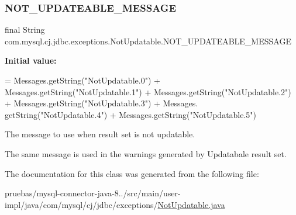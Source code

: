 \subsubsection{\texorpdfstring{N\+O\+T\+\_\+\+U\+P\+D\+A\+T\+E\+A\+B\+L\+E\+\_\+\+M\+E\+S\+S\+A\+GE}{NOT\_UPDATEABLE\_MESSAGE}}
{\footnotesize\ttfamily final String com.\+mysql.\+cj.\+jdbc.\+exceptions.\+Not\+Updatable.\+N\+O\+T\+\_\+\+U\+P\+D\+A\+T\+E\+A\+B\+L\+E\+\_\+\+M\+E\+S\+S\+A\+GE\hspace{0.3cm}{\ttfamily [static]}}

{\bfseries Initial value\+:}
\begin{DoxyCode}
= Messages.getString(\textcolor{stringliteral}{"NotUpdatable.0"}) + Messages.getString(\textcolor{stringliteral}{"NotUpdatable.1"})
            + Messages.getString(\textcolor{stringliteral}{"NotUpdatable.2"}) + Messages.getString(\textcolor{stringliteral}{"NotUpdatable.3"}) + Messages.
      getString(\textcolor{stringliteral}{"NotUpdatable.4"})
            + Messages.getString(\textcolor{stringliteral}{"NotUpdatable.5"})
\end{DoxyCode}
The message to use when result set is not updatable.

The same message is used in the warnings generated by Updatabale result set. 

The documentation for this class was generated from the following file\+:\begin{DoxyCompactItemize}
\item 
pruebas/mysql-\/connector-\/java-\/8../src/main/user-\/impl/java/com/mysql/cj/jdbc/exceptions/\mbox{\hyperlink{_not_updatable_8java}{Not\+Updatable.\+java}}\end{DoxyCompactItemize}
